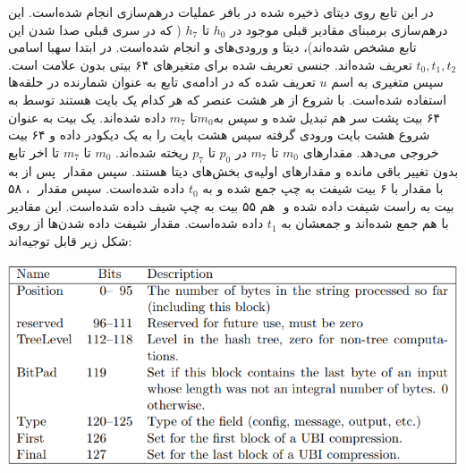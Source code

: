 در این تابع روی دیتای ذخیره شده در بافر عملیات درهم‌سازی انجام شده‌است. این درهم‌سازی برمبنای مقادیر قبلی موجود در $  h_0 $ تا  $ h_7 $ ( که در سری قبلی صدا شدن این تابع مشخص شده‌اند)، دیتا و ورودی‌های  و   انجام شده‌است. 
در ابتدا سهبا اسامی $ t_0 , t_1 , t_2 $ تعریف شده‌اند. جنسی تعریف شده برای متغیرهای ۶۴ بیتی بدون علامت است. سپس متغیری به اسم $ u $ تعریف شده‌ که در ادامه‌ی تابع به عنوان شمارنده در حلقه‌ها استفاده شده‌است. با شروع از  هر هشت عنصر که هر کدام یک بایت هستند توسط  به ۶۴ بیت پشت سر هم تبدیل شده و سپس به$ m_0 $تا $ m_7 $ داده شده‌اند.   یک بیت به عنوان شروع هشت بایت ورودی گرفته سپس هشت بایت را به یک دیکودر داده و ۶۴ بیت خروجی می‌دهد. مقدارهای $ m_0 $ تا $ m_7 $ در $ p_0 $ تا $ p_7 $ ریخته شده‌اند. $ m_0 $ تا $ m_7 $ تا اخر تابع بدون تغییر باقی مانده و مقدارهای اولیه‌ی بخش‌های دیتا هستند.  
سپس مقدار ‌ پس از  به با مقدار  با ۶ بیت شیفت به چپ جمع شده و به $ t_0 $ داده شده‌است. سپس مقدار ‌ ، ۵۸ بیت به راست شیفت داده شده و ‌ هم ۵۵ بیت به چپ شیف داده شده‌است. این مقادیر با هم جمع شده‌‌اند و جمعشان به ‌$ t_1 $ داده شده‌است. مقدار شیفت داده شدن‌ها از روی شکل زیر قابل توجیه‌اند:
\begin{center}
	\includegraphics[width=14cm]{images/tweak.png}
\end{center}

